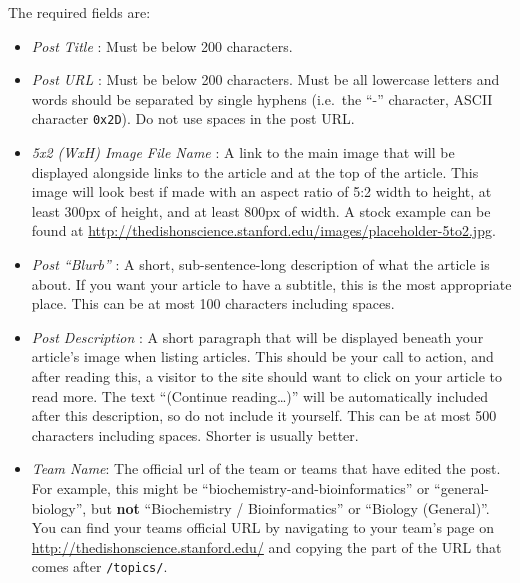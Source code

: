 \documentclass[paper=a4, fontsize=11pt]{scrartcl}
\numberwithin{equation}{section}        %
\numberwithin{figure}{section}            %
\numberwithin{table}{section}                %
\newcommand{\dishurlplain}[1]{http://thedishonscience.stanford.edu/#1}
\newcommand{\dishurl}[1]{\url{\dishurlplain{#1}}}
\begin{document}
\noindent{}The required fields are:\@
\begin{itemize}
    \item \emph{Post Title} : Must be below 200 characters.
    \item \emph{Post URL} : Must be below 200 characters.
        Must be all lowercase letters and words should be separated by single
        hyphens (i.e.\ the ``-'' character, ASCII character \texttt{0x2D}). Do
        not use spaces in the post URL.
    \item \emph{5x2 (WxH) Image File Name} : A link to the main image that will be
        displayed alongside links to the article and at the top of the article.
        This image will look best if made with an aspect ratio of 5:2 width to
        height, at least 300px of height, and at least 800px of width. A stock
        example can be found at \dishurl{images/placeholder-5to2.jpg}.
    \item \emph{Post ``Blurb''} : A short, sub-sentence-long description of what
        the article is about. If you want your article to have a subtitle, this
        is the most appropriate place. This can be at most 100 characters
        including spaces.
    \item \emph{Post Description} : A short paragraph that will be displayed
        beneath your article's image when listing articles. This should be your
        call to action, and after reading this, a visitor to the site should
        want to click on your article to read more. The text ``(Continue
        reading\ldots{})'' will be automatically included after this description, so do
        not include it yourself. This can be at most 500 characters including
        spaces. Shorter is usually better.
    \item \emph{Team Name}: The official url of the team or teams that have edited the
        post. For example, this might be ``biochemistry-and-bioinformatics'' or
        ``general-biology'', but \textbf{not} ``Biochemistry / Bioinformatics'' or
        ``Biology (General)''. You can find your teams official URL by navigating
        to your team's page on \dishurl{} and copying the part of the URL
        that comes after \texttt{/topics/}.
\end{itemize}
\end{document}
